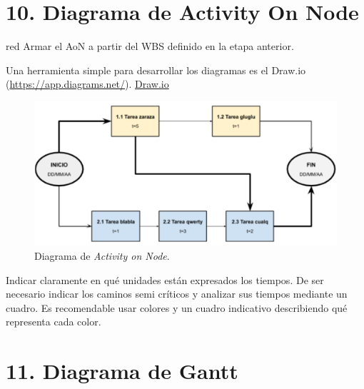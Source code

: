 \documentclass[
    11pt, %
]{charter}
\begin{document}
    \section{10. Diagrama de Activity On Node}
    \label{sec:AoN}

    \begin{consigna}{red}
        Armar el AoN a partir del WBS definido en la etapa anterior.

        Una herramienta simple para desarrollar los diagramas es el Draw.io (\url{https://app.diagrams.net/}).
        \href{https://app.diagrams.net}{Draw.io}


        \begin{figure}[htpb]
            \centering
            \includegraphics[width=.8\textwidth]{./Figuras/AoN.png}
            \caption{Diagrama de \textit{Activity on Node}.}
            \label{fig:AoN}
        \end{figure}

        Indicar claramente en qué unidades están expresados los tiempos.
        De ser necesario indicar los caminos semi críticos y analizar sus tiempos mediante un cuadro.
        Es recomendable usar colores y un cuadro indicativo describiendo qué representa cada color.

    \end{consigna}


    \section{11. Diagrama de Gantt}
    \label{sec:gantt}
\end{document}
